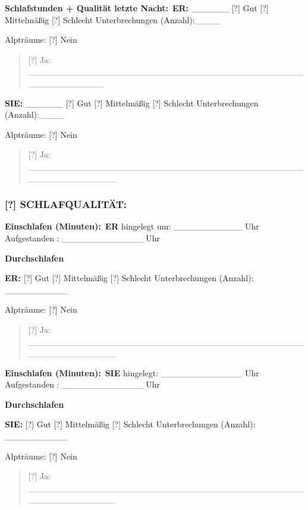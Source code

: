 \textbf{Schlafstunden + Qualität letzte Nacht:}\
\textbf{ER:} \_\_\_\_\_\_ [?] Gut [?] Mittelmäßig [?] Schlecht Unterbrechungen (Anzahl):\_\_\_\_

Alpträume: [?] Nein

\begin{quote}
[?] Ja: \_\_\_\_\_\_\_\_\_\_\_\_\_\_\_\_\_\_\_\_\_\_\_\_\_\_\_\_\_\_\_\_\_\_\_\_\_\_\_\_\_\_\_\_\_\_\_\_\_\_\_\_\_\_\_\_
\end{quote}

\textbf{SIE:} \_\_\_\_\_\_ [?] Gut [?] Mittelmäßig [?] Schlecht Unterbrechungen (Anzahl):\_\_\_\_

Alpträume: [?] Nein

\begin{quote}
[?] Ja: \_\_\_\_\_\_\_\_\_\_\_\_\_\_\_\_\_\_\_\_\_\_\_\_\_\_\_\_\_\_\_\_\_\_\_\_\_\_\_\_\_\_\_\_\_\_\_\_\_\_\_\_\_\_\_\_\_\_
\end{quote}

\hypertarget{schlafqualituxe4t}{%
\subsubsection{\texorpdfstring{\textbf{[?] SCHLAFQUALITÄT:}}{[?] SCHLAFQUALITÄT:}}\label{schlafqualituxe4t}}

\textbf{Einschlafen (Minuten):}\
\textbf{ER} hingelegt um: \_\_\_\_\_\_\_\_\_\_\_ Uhr Aufgestanden : \_\_\_\_\_\_\_\_\_\_\_\_\_ Uhr

\textbf{Durchschlafen}

\textbf{ER:} [?] Gut [?] Mittelmäßig [?] Schlecht Unterbrechungen (Anzahl): \_\_\_\_\_\_\_\_\_\_

Alpträume: [?] Nein

\begin{quote}
[?] Ja: \_\_\_\_\_\_\_\_\_\_\_\_\_\_\_\_\_\_\_\_\_\_\_\_\_\_\_\_\_\_\_\_\_\_\_\_\_\_\_\_\_\_\_\_\_\_\_\_\_\_\_\_\_\_\_\_\_\_
\end{quote}

\textbf{Einschlafen (Minuten):}\
\textbf{SIE} hingelegt: \_\_\_\_\_\_\_\_\_\_\_\_\_ Uhr Aufgestanden : \_\_\_\_\_\_\_\_\_\_\_\_\_ Uhr

\textbf{Durchschlafen}

\textbf{SIE:} [?] Gut [?] Mittelmäßig [?] Schlecht Unterbrechungen (Anzahl): \_\_\_\_\_\_\_\_\_\_

Alpträume: [?] Nein

\begin{quote}
[?] Ja: \_\_\_\_\_\_\_\_\_\_\_\_\_\_\_\_\_\_\_\_\_\_\_\_\_\_\_\_\_\_\_\_\_\_\_\_\_\_\_\_\_\_\_\_\_\_\_\_\_\_\_\_\_\_\_\_\_\_
\end{quote}

